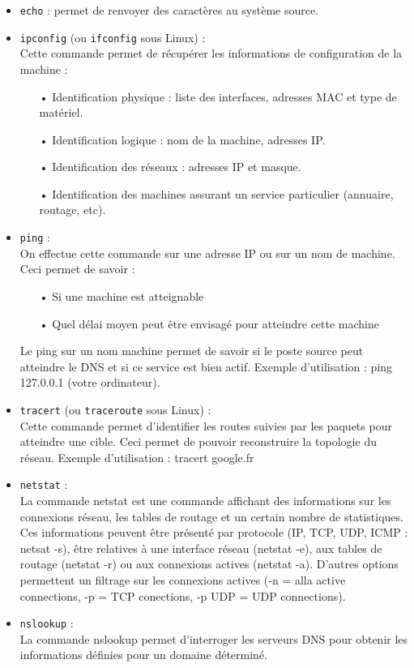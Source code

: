 \documentclass[a4paper]{article}
\begin{document}
	\begin{itemize}
	\item \texttt{echo} : permet de renvoyer des caractères au système source.
		
	\item \texttt{ipconfig} (ou \texttt{ifconfig} sous Linux) : \\
	Cette commande permet de récupérer les informations de configuration de la machine : 
		\begin{itemize}
		\item[•]Identification physique : liste des interfaces, adresses MAC et type de matériel.
		\item[•]Identification logique : nom de la machine, adresses IP.
		\item[•]Identification des réseaux : adresses IP et masque.
		\item[•]Identification des machines assurant un service particulier (annuaire, routage, etc).
		\end{itemize}
		
	\item \texttt{ping} : \\
	On effectue cette commande sur une adresse IP ou sur un nom de machine. Ceci permet de savoir : 
		\begin{itemize}	
		\item[•]Si une machine est atteignable
		\item[•]Quel délai moyen peut être envisagé pour atteindre cette machine
		\end{itemize}
	Le ping sur un nom machine permet de savoir si le poste source peut atteindre le DNS et si ce service est bien actif.
	Exemple d'utilisation : ping 127.0.0.1 (votre ordinateur).
	
	\item \texttt{tracert} (ou \texttt{traceroute} sous Linux) : \\
	Cette commande permet d'identifier les routes suivies par les paquets pour atteindre une cible. Ceci permet de pouvoir reconstruire la topologie du réseau.
	Exemple d'utilisation : tracert google.fr
	
	\item \texttt{netstat} :\\
	La commande netstat est une commande affichant des informations sur les connexions réseau, les tables de routage et un certain nombre de statistiques. 
	Ces informations peuvent être présenté par  protocole (IP, TCP, UDP, ICMP : netsat -s), être relatives à une interface réseau (netstat -e), aux tables de routage (netstat -r) 
	ou aux connexions actives (netstat -a). D'autres options permettent un filtrage sur les connexions actives (-n = alla active connections, -p = TCP conections, -p UDP = UDP connections).
	
	\item \texttt{nslookup} : \\
	La commande nslookup permet d'interroger les serveurs DNS pour obtenir les informations définies pour un domaine déterminé.
	\end{itemize}
\end{document}
